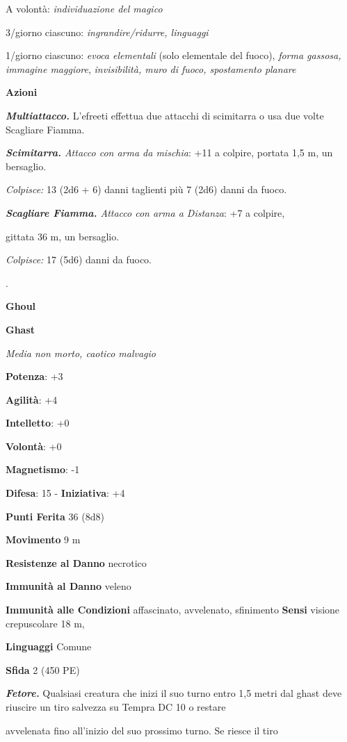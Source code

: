 \begin{multicols}{2}
A volontà: \emph{individuazione del magico}

3/giorno ciascuno: \emph{ingrandire/ridurre, linguaggi}

1/giorno ciascuno: \emph{evoca elementali} (solo elementale del fuoco),
\emph{forma gassosa, immagine maggiore}, \emph{invisibilità, muro di
fuoco, spostamento planare}

\textbf{Azioni}

\emph{\textbf{Multiattacco.}} L'efreeti effettua due attacchi di
scimitarra o usa due volte Scagliare Fiamma.

\emph{\textbf{Scimitarra.} Attacco con arma da mischia}: +11 a colpire,
portata 1,5 m, un bersaglio.

\emph{Colpisce:} 13 (2d6 + 6) danni taglienti più 7 (2d6) danni da
fuoco.

\emph{\textbf{Scagliare Fiamma.} Attacco con arma a Distanza}: +7 a
colpire,

gittata 36 m, un bersaglio.

\emph{Colpisce:} 17 (5d6) danni da fuoco.

.

\textbf{Ghoul}

\textbf{Ghast}

\emph{Media non morto, caotico malvagio}

\textbf{Potenza}: +3

\textbf{Agilità}: +4

\textbf{Intelletto}: +0

\textbf{Volontà}: +0

\textbf{Magnetismo}: -1

\textbf{Difesa}: 15 - \textbf{Iniziativa}: +4

\textbf{Punti Ferita} 36 (8d8)

\textbf{Movimento} 9 m

\textbf{Resistenze al Danno} necrotico

\textbf{Immunità al Danno} veleno

\textbf{Immunità alle Condizioni} affascinato, avvelenato, sfinimento
\textbf{Sensi} visione crepuscolare 18 m, 

\textbf{Linguaggi} Comune

\textbf{Sfida} 2 (450 PE)

\emph{\textbf{Fetore.}} Qualsiasi creatura che inizi il suo turno entro
1,5 metri dal ghast deve riuscire un tiro salvezza su Tempra DC 10
o restare

avvelenata fino all'inizio del suo prossimo turno. Se riesce il tiro


\end{multicols}
